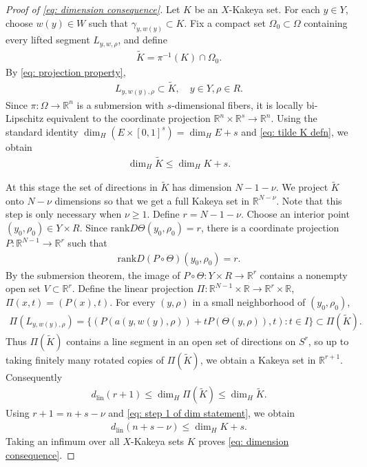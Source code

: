 \documentclass[reqno,11pt]{amsart}
\numberwithin{equation}{section}
\numberwithin{figure}{section}
\def\R{\mathbb{R}}
\renewcommand\leq{\leqslant}
\renewcommand\geq{\geqslant}
\theoremstyle{plain}
\theoremstyle{definition}
\newcommand{\rank}{\mathrm{rank}}
\newcommand{\lin}{\mathrm{lin}}
\begin{document}
    
    \begin{proof}[Proof of \eqref{eq: dimension consequence}]


    Let $K$ be an $X$-Kakeya set. For each $y \in Y$, choose $w(y) \in W$ such that $\gamma_{y,w(y)} \subset  K$.
    Fix a compact set $\Omega_0 \subset \Omega$ containing every lifted segment $L_{y,w,\rho}$, and define 
    \begin{align}\label{eq: tilde K defn}
        \widetilde K = \pi^{-1}(K) \cap \Omega_0.
    \end{align}
    By \eqref{eq: projection property}, 
    \begin{align}
        L_{y,w(y), \rho} \subset \widetilde K, \quad y \in Y, \rho \in R.
    \end{align}
    Since $\pi : \Omega \to \R^n$ is a submersion with $s$-dimensional fibers, it is locally bi-Lipschitz equivalent to the coordinate projection $\R^n \times \R^s \to \R^n$. Using the standard identity $\dim_H(E \times [0,1]^s) = \dim_{H} E + s$ and \eqref{eq: tilde K defn}, we obtain 
    \begin{align}\label{eq: step 1 of dim statement}
        \dim_H \widetilde K \leq \dim_H K + s.
    \end{align}
    
    At this stage the set of directions in $\widetilde K$ has dimension $N-1-\nu$. We project $\widetilde K$ onto $N - \nu$ dimensions so that we get a full Kakeya set in $\R^{N - \nu}$. Note that this step is only necessary when $\nu \geq 1$. 
    Define $r = N-1 -\nu$.
    Choose an interior point $(y_0,\rho_0) \in Y \times R$. Since $\rank D\Theta(y_0,\rho_0) = r$, there is a coordinate projection $P : \R^{N-1} \to \R^r$ such that 
    \begin{align}
        \rank D(P \circ \Theta )(y_0,\rho_0) = r.
    \end{align}
    By the submersion theorem, the image of $P \circ \Theta : Y \times R \to \R^{r}$ contains a nonempty open set $V \subset \R^r$. Define the linear projection $\Pi : \R^{N-1} \times \R \to \R^r \times \R$, $\Pi(x,t) = (P(x),t)$. For every $(y,\rho)$ in a small neighborhood of $(y_0,\rho_0)$, 
    \begin{align}
        \Pi(L_{y,w(y),\rho}) = \{ (P(a(y,w(y),\rho)) + t P(\Theta(y,\rho)), t) : t \in I\} \subset \Pi(\widetilde K).
    \end{align}
    Thus $\Pi(\widetilde K)$ contains a line segment in an open set of directions on $S^r$, so up to taking finitely many rotated copies of $\Pi(\widetilde K)$, we obtain a Kakeya set in $\R^{r+1}$. Consequently
    \begin{align}
        d_{\lin}(r + 1) \leq \dim_H \Pi(\widetilde K) \leq \dim_H \widetilde K.
    \end{align}
    Using $r + 1 = n + s -\nu$ and \eqref{eq: step 1 of dim statement}, we obtain 
    \begin{align}
        d_{\lin}(n+s-\nu) \leq \dim_H K + s.
    \end{align}
    Taking an infimum over all $X$-Kakeya sets $K$ proves \eqref{eq: dimension consequence}.
  
    \end{proof}
\end{document}
